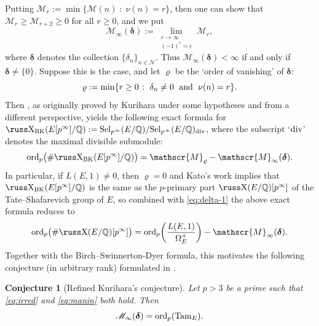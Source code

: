 \documentclass[10pt,reqno]{amsart}
\numberwithin{equation}{section}
\theoremstyle{plain}
\theoremstyle{definition}
\theoremstyle{definition}
\theoremstyle{plain}
\theoremstyle{plain}
\theoremstyle{plain}
\theoremstyle{plain}
\theoremstyle{plain}
\theoremstyle{plain}
\newtheorem{conjintro}{Conjecture}
\newcommand{\Z}{\mathbb{Z}}
\newcommand{\Q}{\mathbb{Q}}
\def\sha{\hbox{\russ\char88}}
\begin{document}
Putting $\mathscr{M}_{r}:=\min\{\mathscr{M}(n)\;\colon\;\nu(n)=r\}$, then one can show that 
$\mathscr{M}_{r}\geq\mathscr{M}_{r+2}\geq 0$ for all $r\geq 0$, and we put
\[
\mathscr{M}_{\infty}(\boldsymbol{\delta}):=\lim_{\substack{r\to\infty\\(-1)^r=\epsilon}}\mathscr{M}_{r},
\]
where $\boldsymbol{\delta}$ denotes the collection $\{\delta_n\}_{n\in\mathcal{N}}$. Thus  $\mathscr{M}_\infty(\boldsymbol{\delta})<\infty$ if and only if $\boldsymbol{\delta}\neq\{0\}$. Suppose %
this is the case, and let $\varrho$ be the `order of vanishing' of $\boldsymbol{\delta}$:
\[
\varrho:=\min\{r\geq 0\;\colon\;\textrm{$\delta_n\neq 0$\; and\; $\nu(n)=r$}\}.
\]
Then \cite[Thm.~1.8]{kim}, as originally proved by Kurihara \cite[Thm.~B]{kurihara-munster} under some hypotheses and from a different perspective, yields the following exact formula for $\sha_{\rm BK}(E[p^\infty]/\Q):={\rm Sel}_{p^\infty}(E/\Q)/{\rm Sel}_{p^\infty}(E/\Q)_{\rm div}$, where the subscript `${\rm div}$' denotes the maximal divisible submodule:
\begin{equation}\label{eq:str-Selmer}
{\rm ord}_p\bigl(\#\sha_{\rm BK}(E[p^\infty]/\Q)\bigr)=\mathscr{M}_\varrho-\mathscr{M}_{\infty}(\boldsymbol{\delta}).\nonumber
\end{equation}
In particular, if $L(E,1)\neq 0$, then $\varrho=0$ and  Kato's work \cite{kato-euler-systems} implies that $\sha_{\rm BK}(E[p^\infty]/\Q)$ is the same as the $p$-primary part $\sha(E/\Q)[p^\infty]$ of the Tate--Shafarevich group of $E$, so combined with \eqref{eq:delta-1} the above exact formula reduces to
\begin{equation}\label{eq:str-Selmer-rank0}
{\rm ord}_p\bigl(\#\sha(E/\Q)[p^\infty]\bigr)={\rm ord}_p\biggl(\frac{L(E,1)}{\Omega_E^+}\biggr)-\mathscr{M}_{\infty}(\boldsymbol{\delta}).\nonumber
\end{equation}
Together with the Birch--Swinnerton-Dyer formula, this motivates the following conjecture (in arbitrary rank)  formulated in \cite[Conj.~1.9]{kim}. 

\begin{conjintro}[Refined Kurihara's  conjecture]\label{conj:refined-Kur}
Let $p>3$ be a prime such that \eqref{eq:irred} and \eqref{eq:manin} both hold. Then
\[
\mathscr{M}_\infty(\boldsymbol{\delta})={\rm ord}_p({\rm Tam}_E).
\]
\end{conjintro}
\end{document}
